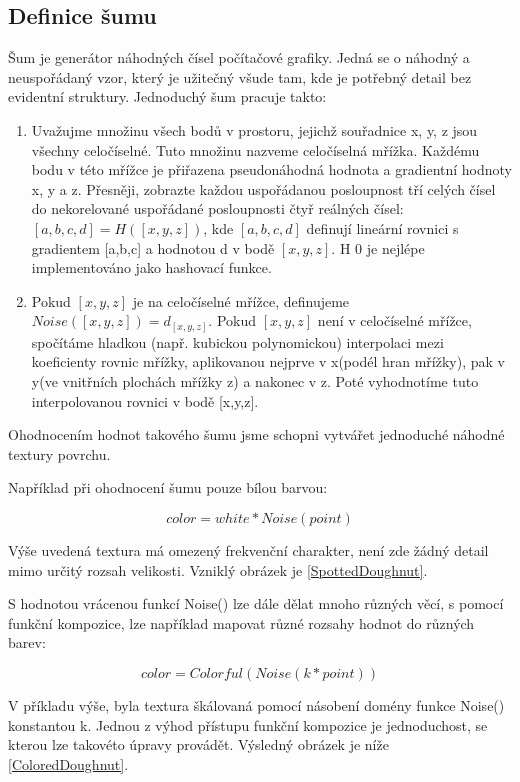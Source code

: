 \subsection{Definice šumu}
Šum je generátor náhodných čísel počítačové grafiky. \cite{PerlinKen} Jedná se o náhodný a neuspořádaný vzor, který je užitečný všude tam, kde je potřebný detail bez evidentní struktury. Jednoduchý šum pracuje takto:
\begin{enumerate}
	\item Uvažujme množinu všech bodů v prostoru, jejichž souřadnice x, y, z jsou všechny celočíselné. Tuto množinu nazveme celočíselná mřížka. Každému bodu v této mřížce je přiřazena pseudonáhodná hodnota a gradientní hodnoty x, y a z. Přesněji, zobrazte každou uspořádanou posloupnost tří celých čísel do nekorelované uspořádané posloupnosti čtyř reálných čísel: $[a,b,c,d] = H([x,y,z])$, kde $[a,b,c,d]$ definují lineární rovnici s gradientem [a,b,c] a hodnotou d v bodě $[x,y,z]$. H 0 je nejlépe implementováno jako hashovací funkce.
	\item Pokud $[x,y,z]$ je na celočíselné mřížce, definujeme $Noise([x,y,z]) = d_{[x,y,z]}$. Pokud $[x,y,z]$ není v celočíselné mřížce, spočítáme hladkou (např. kubickou polynomickou) interpolaci mezi koeficienty rovnic mřížky, aplikovanou nejprve v x(podél hran mřížky), pak v y(ve vnitřních plochách mřížky z) a nakonec v z. Poté vyhodnotíme tuto interpolovanou rovnici v bodě [x,y,z]. 
\end{enumerate}

Ohodnocením hodnot takového šumu jsme schopni vytvářet jednoduché náhodné textury povrchu. \cite{PerlinKen} 

Například při ohodnocení šumu pouze bílou barvou:

\[color = white * Noise(point)\]

Výše uvedená textura má omezený frekvenční charakter, není zde žádný detail mimo určitý rozsah velikosti. Vzniklý obrázek je \ref{SpottedDoughnut}.

S hodnotou vrácenou funkcí Noise() \cite{Perlin2002ImprovingN} lze dále dělat mnoho různých věcí, s pomocí funkční kompozice, lze například mapovat různé rozsahy hodnot do různých barev:

\[color = Colorful(Noise(k * point))\]

V příkladu výše, byla textura škálovaná pomocí násobení domény funkce Noise() konstantou k. Jednou z výhod přístupu funkční kompozice je jednoduchost, se kterou lze takovéto úpravy provádět. Výsledný obrázek je níže \ref{ColoredDoughnut}.

